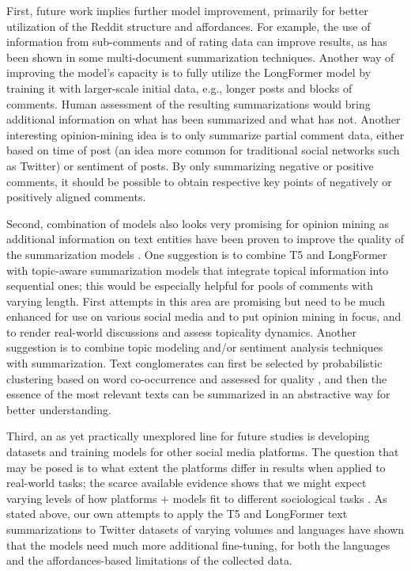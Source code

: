 First, future work implies further model improvement, primarily for better utilization of the Reddit structure and affordances. For example, the use of information from sub-comments and of rating data can improve results, as has been shown in some multi-document summarization techniques. Another way of improving the model’s capacity is to fully utilize the LongFormer model by training it with larger-scale initial data, e.g., longer posts and blocks of comments. Human assessment of the resulting summarizations would bring additional information on what has been summarized and what has not. Another interesting opinion-mining idea is to only summarize partial comment data, either based on time of post (an idea more common for traditional social networks such as Twitter) or sentiment of posts. By only summarizing negative or positive comments, it should be possible to obtain respective key points of negatively or positively aligned comments.

Second, combination of models also looks very promising for opinion mining as additional information on text entities have been proven to improve the quality of the summarization models \cite{KourisAlexandridisStafylopatis}. One suggestion is to combine T5 and LongFormer with topic-aware summarization models \cite{NguyenLuuLu,ZhengZhangWang,WangDuanZhang,AilemZhangSha} that integrate topical information into sequential ones; this would be especially helpful for pools of comments with varying length. First attempts in this area are promising but need to be much enhanced for use on various social media and to put opinion mining in focus, and to render real-world discussions and assess topicality dynamics. Another suggestion is to combine topic modeling and/or sentiment analysis techniques with summarization. Text conglomerates can first be selected by probabilistic clustering based on word co-occurrence and assessed for quality \cite{BodrunovaKoltcovKoltsova}, and then the essence of the most relevant texts can be summarized in an abstractive way for better understanding.

Third, an as yet practically unexplored line for future studies is developing datasets and training models for other social media platforms. The question that may be posed is to what extent the platforms differ in results when applied to real-world tasks; the scarce available evidence shows that we might expect varying levels of how platforms \(+\) models fit to different sociological tasks \cite{PriyaSequeiraChandra}. As stated above, our own attempts to apply the T5 and LongFormer text summarizations to Twitter datasets of varying volumes and languages \cite{BodrunovaBlekanovTarasov} have shown that the models need much more additional fine-tuning, for both the languages and the affordances-based limitations of the collected data.

